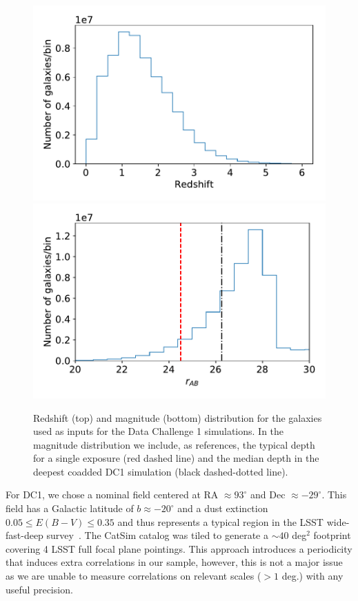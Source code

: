 \documentclass[\docopts]{\docclass}
\begin{document}
\begin{figure}
\centering
\includegraphics[width=0.9\columnwidth]{N_z_DC1.pdf}
\includegraphics[width=0.9\columnwidth]{N_m_DC1.pdf}
\caption{Redshift (top) and magnitude (bottom) distribution for the galaxies used as inputs for the Data Challenge 1 simulations. In the magnitude distribution we include, as references, the typical depth for a single exposure (red dashed line) and the median depth in the deepest coadded DC1 simulation (black dashed-dotted line).}
\label{fig:catalog_plots}
\end{figure}


For DC1, we chose a nominal field centered at RA $\approx 93^{\circ}$ and Dec $\approx -29^{\circ}$. This field has a Galactic latitude of $b \approx -20^{\circ}$ and a dust extinction $0.05 \leq E(B-V) \leq 0.35$ and thus represents a typical region in the LSST wide-fast-deep survey~\citep{Overview}. The CatSim catalog was tiled to generate a $\sim 40$ deg$^{2}$ footprint covering 4 LSST full focal plane pointings. This approach introduces a periodicity that induces extra correlations in our sample, however, this is not a major issue as we are unable to measure correlations on relevant scales ($> 1$ deg.) with any useful precision.
\end{document}
